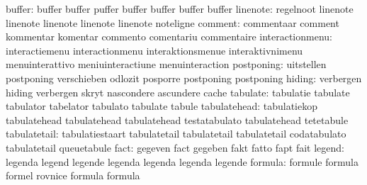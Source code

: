                    buffer: buffer                    buffer
                           puffer                    buffer
                           buffer                    buffer
                           buffer
                 linenote: regelnoot                 linenote
                           linenote                  linenote
                           linenote                  linenote
                           noteligne
                  comment: commentaar                comment
                           kommentar                 komentar
                           commento                  comentariu
                           commentaire
          interactionmenu: interactiemenu            interactionmenu
                           interaktionsmenue         interaktivnimenu
                           menuinterattivo           meniuinteractiune
                           menuinteraction
               postponing: uitstellen                postponing
                           verschieben               odlozit
                           posporre                  postponing
                           postponing
                   hiding: verbergen                 hiding
                           verbergen                 skryt
                           nascondere                ascundere
                           cache
                 tabulate: tabulatie                 tabulate
                           tabulator                 tabelator
                           tabulato                  tabulate
                           tabule
             tabulatehead: tabulatiekop              tabulatehead
                           tabulatehead              tabulatehead
                           testatabulato             tabulatehead
                           tetetabule
             tabulatetail: tabulatiestaart           tabulatetail
                           tabulatetail              tabulatetail
                           codatabulato              tabulatetail
                           queuetabule
                     fact: gegeven                   fact
                           gegeben                   fakt
                           fatto                     fapt
                           fait
                   legend: legenda                   legend
                           legende                   legenda
                           legenda                   legenda
                           legende
                  formula: formule                   formula
                           formel                    rovnice
                           formula                   formula
